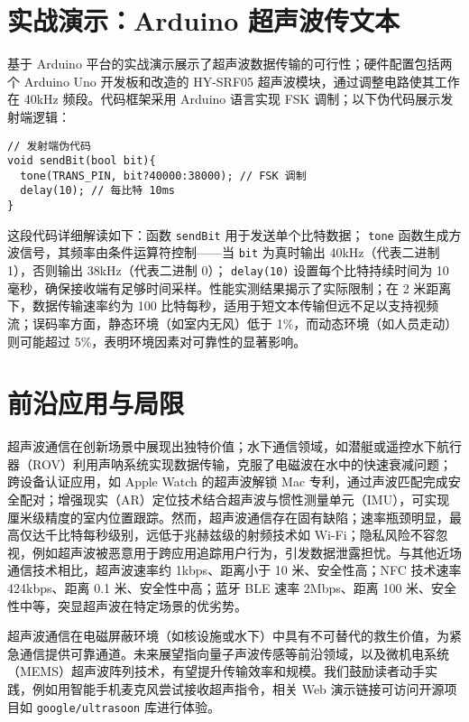 \chapter{实战演示：Arduino 超声波传文本}
基于 Arduino 平台的实战演示展示了超声波数据传输的可行性；硬件配置包括两个 Arduino Uno 开发板和改造的 HY-SRF05 超声波模块，通过调整电路使其工作在 40kHz 频段。代码框架采用 Arduino 语言实现 FSK 调制；以下伪代码展示发射端逻辑：\par
\begin{lstlisting}[language=arduino]
// 发射端伪代码
void sendBit(bool bit){
  tone(TRANS_PIN, bit?40000:38000); // FSK 调制
  delay(10); // 每比特 10ms
}
\end{lstlisting}
这段代码详细解读如下：函数 \texttt{sendBit} 用于发送单个比特数据； \texttt{tone} 函数生成方波信号，其频率由条件运算符控制——当 \texttt{bit} 为真时输出 40kHz（代表二进制 1），否则输出 38kHz（代表二进制 0）； \texttt{delay(10)} 设置每个比特持续时间为 10 毫秒，确保接收端有足够时间采样。性能实测结果揭示了实际限制；在 2 米距离下，数据传输速率约为 100 比特每秒，适用于短文本传输但远不足以支持视频流；误码率方面，静态环境（如室内无风）低于 1\%{}，而动态环境（如人员走动）则可能超过 5\%{}，表明环境因素对可靠性的显著影响。\par
\chapter{前沿应用与局限}
超声波通信在创新场景中展现出独特价值；水下通信领域，如潜艇或遥控水下航行器（ROV）利用声呐系统实现数据传输，克服了电磁波在水中的快速衰减问题；跨设备认证应用，如 Apple Watch 的超声波解锁 Mac 专利，通过声波匹配完成安全配对；增强现实（AR）定位技术结合超声波与惯性测量单元（IMU），可实现厘米级精度的室内位置跟踪。然而，超声波通信存在固有缺陷；速率瓶颈明显，最高仅达千比特每秒级别，远低于兆赫兹级的射频技术如 Wi-Fi；隐私风险不容忽视，例如超声波被恶意用于跨应用追踪用户行为，引发数据泄露担忧。与其他近场通信技术相比，超声波速率约 1kbps、距离小于 10 米、安全性高；NFC 技术速率 424kbps、距离 0.1 米、安全性中高；蓝牙 BLE 速率 2Mbps、距离 100 米、安全性中等，突显超声波在特定场景的优劣势。\par
超声波通信在电磁屏蔽环境（如核设施或水下）中具有不可替代的救生价值，为紧急通信提供可靠通道。未来展望指向量子声波传感等前沿领域，以及微机电系统（MEMS）超声波阵列技术，有望提升传输效率和规模。我们鼓励读者动手实践，例如用智能手机麦克风尝试接收超声指令，相关 Web 演示链接可访问开源项目如 \texttt{google/ultrasoon} 库进行体验。\par
